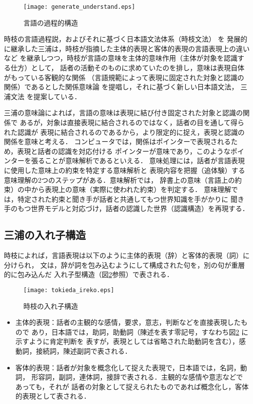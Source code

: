 \documentclass[japanese]{jnlp_1.2}
\begin{document}
\begin{figure}[b]
  \centering
      \texttt{[image: generate\_understand.eps]}
  \caption{言語の過程的構造} \label{fig:generate_understand}
\end{figure}

時枝の言語過程説，およびそれに基づく日本語文法体系（時枝文法）
\cite{時枝1941,時枝1950}
を
発展的に継承した三浦は，時枝が指摘した主体的表現と客体的表現の言語表現上の違いなど
を継承しつつ，時枝が言語の意味を主体的意味作用（主体が対象を認識する仕方）として，
話者の活動そのものに求めていたのを排し，意味は表現自体がもっている客観的な関係
（言語規範によって表現に固定された対象と認識の関係）であるとした関係意味論
\cite{三浦1977,池原1991}
を提唱し，それに基づく新しい日本語文法，
三浦文法 
\cite{三浦1967a,三浦1967b,三浦1972,三浦1975,三浦1976}
を提案している．

三浦の意味論によれば，言語の意味は表現に結び付き固定された対象と認識の関係で
あるが，対象は直接表現に結合されるのではなく，話者の目を通して得られた認識が
表現に結合されるのであるから，より限定的に捉え，表現と認識の関係を意味と考える．
コンピュータでは，関係はポインターで表現されるため，表現と話者の認識を対応付ける
ポインターが意味であり，このようなポインターを張ることが意味解析であるといえる．
意味処理には，話者が言語表現に使用した意味上の約束を特定する意味解析と
表現内容を把握（追体験）する意味理解の2つのステップがある．意味解析では，
辞書上の意味（言語上の約束）の中から表現上の意味（実際に使われた約束）を判定する．
意味理解では，特定された約束と聞き手が話者と共通してもつ世界知識を手がかりに
聞き手のもつ世界モデルと対応づけ，話者の認識した世界（認識構造）を再現する．

\subsection{三浦の入れ子構造}
時枝によれば，言語表現は以下のように主体的表現（辞）と客体的表現（詞）に分けられ，
文は，辞が詞を包み込むようにして構成された句を，別の句が重層的に包み込んだ
入れ子型構造（図\ref{fig:tokieda_ireko}参照）で表される．

\begin{figure}[b]
  \centering
      \texttt{[image: tokieda\_ireko.eps]}
  \caption{時枝の入れ子構造} \label{fig:tokieda_ireko}
\end{figure}

\begin{itemize}
\item 主体的表現：話者の主観的な感情，要求，意志，判断などを直接表現したもので
あり，日本語では，助詞，助動詞（陳述を表す零記号，すなわち図\ref{fig:tokieda_ireko}
に示すように肯定判断を
表すが，表現としては省略された助動詞を含む），感動詞，接続詞，陳述副詞で表される．

\item 客体的表現：話者が対象を概念化して捉えた表現で，日本語では，名詞，動詞，
形容詞，副詞，連体詞，接辞で表される．主観的な感情や意志などであっても，それが
話者の対象として捉えられたものであれば概念化し，客体的表現として表される．
\end{itemize}
\end{document}
